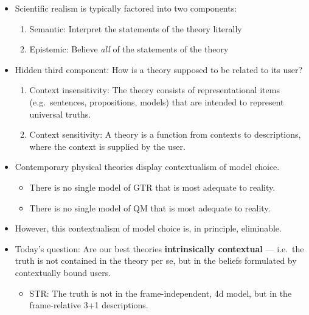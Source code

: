 \documentclass[fleqn]{beamer}
\begin{document}
\begin{frame}

  \begin{itemize}
  \item Scientific realism is typically factored into two components:
  \begin{enumerate}
  \item Semantic: Interpret the statements of the theory literally
  \item Epistemic: Believe \textit{all} of the statements of the
    theory
  \end{enumerate}
  
\item Hidden third component: How is a theory supposed to be related
  to its user?

  \begin{enumerate}
  \item Context insensitivity: The theory consists of representational
    items (e.g.\ sentences, propositions, models) that are intended to
    represent universal truths.
  \item Context sensitivity: A theory is a function from contexts to
    descriptions, where the context is supplied by the user.
  \end{enumerate}
  
\end{itemize}

\end{frame}



\begin{frame}{ }

  \begin{itemize}

  \item Contemporary physical theories display contextualism of model
    choice.
    \begin{itemize}
    \item There is no single model of GTR that is most adequate to
      reality.
    \item There is no single model of QM that is most adequate to
      reality.
   \end{itemize}
 \item However, this contextualism of model choice is, in principle,
   eliminable.
 \item Today's question: Are our best theories \textbf{intrinsically
     contextual} --- i.e.\ the truth is not contained in the theory
   per se, but in the beliefs formulated by contextually bound users.
   \begin{itemize}
   \item STR: The truth is not in the frame-independent, 4d model, but
     in the frame-relative 3+1 descriptions.
   \end{itemize}
  \end{itemize}
\end{frame}
\end{document}
